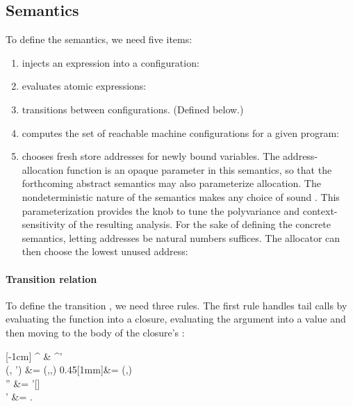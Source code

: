 \subsection{Semantics}

To define the semantics, we need five items:
\begin{enumerate}
\item  injects an expression into
a configuration:




\item{ evaluates atomic expressions:
}

\item{ transitions between
configurations. (Defined below.)}

\item{ computes the set of
 reachable machine configurations for a given program:
 }

\item{ 
chooses fresh store addresses for newly bound variables.
The address-allocation function is an opaque parameter in this semantics,
so that the forthcoming abstract semantics may also parameterize allocation. 
The nondeterministic nature of the semantics makes any choice of  sound \citep{mattmight:Might:2009:APosteriori}.
This parameterization provides the knob to tune the polyvariance and context-sensitivity of the resulting analysis.
For the sake of defining the concrete semantics, letting addresses be natural numbers suffices.
The allocator can then choose the lowest unused address:
}
\end{enumerate}









\paragraph{Transition relation}
To define the transition , we need three rules.
The first rule handles tail calls by evaluating the function into a closure, evaluating the argument into a value and then moving to the body of the closure's \lamterm{}:
\begin{center}
  [-1cm]{
  \overbrace{(\sembr{\appform{\fexpr}{\aexpr}}, \env, \store, \cont)}^{\conf}
  &\To
  ^{\conf'}
  \\
  (\sembr{\lamform{\vv}{\expr}}, \env') &= \ArgEval(\fexpr,\env,\store)}
  {0.45}[1mm]{\addr &= \alloc(\vv,\conf)
  \\
  \env'' &= \env'[\vv \mapsto \addr]
  \\
  \store' &= \store[\addr \mapsto \ArgEval(\aexpr,\env,\store)]
  \text.}
\end{center}

